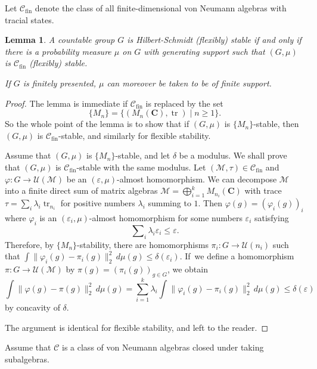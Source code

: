 \documentclass[JEP,XML,SOM,Unicode,published]{cedram}
\theoremstyle{plain}
\newtheorem{lemma}[theorem]{Lemma}
\theoremstyle{definition}
\newcommand{\C}{\mathbf{C}}
\newcommand{\cM}{\mathcal{M}}
\newcommand{\vn}{\mathcal{C}}
\newcommand{\cU}{\mathcal{U}}
\DeclareMathOperator{\tr}{tr}
\begin{document}
Let $\vn_{\mathrm{fin}}$ denote the class of all finite-dimensional von Neumann algebras with tracial states.
\begin{lemma} A countable group $G$ is Hilbert-Schmidt (flexibly) stable if and only if there is a probability measure $\mu$ on $G$ with generating support such that $(G,\mu)$ is $\vn_{\mathrm{fin}}$ (flexibly) stable.

If $G$ is finitely presented, $\mu$ can moreover be taken to be of finite support.
\end{lemma}
\begin{proof}
The lemma is immediate if $\vn_{\mathrm{fin}}$ is replaced by the set \[
\{M_n\} = \{(M_n(\C),\tr) \mid n\geq 1\}.
\] So the whole point of the lemma is to show that if $(G,\mu)$ is $\{M_n\}$-stable, then $(G,\mu)$ is $\vn_{\mathrm{fin}}$-stable, and similarly for flexible stability.

Assume that $(G,\mu)$ is $\{M_n\}$-stable, and let $\delta$ be a modulus. We shall prove that $(G,\mu)$ is $\vn_{\mathrm{fin}}$-stable with the same modulus. Let $(\cM,\tau) \in \vn_{\mathrm{fin}}$ and $\varphi:G\to \cU(\cM)$ be an $(\varepsilon,\mu)$-almost homomorphism. We can decompose $\cM$ into a finite direct sum of matrix algebras $\cM = \bigoplus_{i=1}^k M_{n_i}(\C)$ with trace $\tau = \sum_i \lambda_i \tr_{n_i}$ for positive numbers $\lambda_i$ summing to $1$. Then $\varphi(g) = (\varphi_i(g))_i$ where $\varphi_i$ is an $(\varepsilon_i,\mu)$-almost homomorphism for some numbers $\varepsilon_i$ satisfying
\[
\sum\nolimits_i \lambda_i\varepsilon_i\leq\varepsilon.
\]
Therefore, by $\{M_n\}$-stability, there are homomorphisms $\pi_i \colon G\to\cU(n_i)$ such that $\int\|\varphi_i(g) - \pi_i(g)\|_2^2\,d\mu(g) \leq \delta(\varepsilon_i)$. If~we define a homomorphism $\pi:G\to \cU(\cM)$ by $\pi(g) = (\pi_i(g))_{g\in G}$, we obtain
\[
\int \|\varphi(g) - \pi(g)\|_2^2 \,d\mu(g) = \sum_{i=1}^k\lambda_i \int\|\varphi_i(g) - \pi_i(g)\|_2^2\,d\mu(g) \leq \delta(\varepsilon)
\]
by concavity of $\delta$.

The argument is identical for flexible stability, and left to the reader.
\end{proof}

Assume that $\vn$ is a class of von Neumann algebras closed under taking subalgebras.
\end{document}
